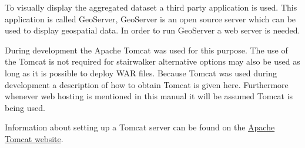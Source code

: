To visually display the aggregated dataset a third party application is used. This application is called GeoServer, GeoServer is an open source server which can be used to display geospatial data. In order to run GeoServer a web server is needed. 

During development the Apache Tomcat was used for this purpose. The use of the Tomcat is not required for stairwalker alternative options may also be used as long as it is possible to deploy WAR files. Because Tomcat was used during development a description of how to obtain Tomcat is given here. Furthermore whenever web hosting is mentioned in this manual it will be assumed Tomcat is being used.

Information about setting up a Tomcat server can be found on the \href{http://tomcat.apache.org/}{Apache Tomcat website}.